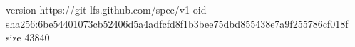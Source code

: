 version https://git-lfs.github.com/spec/v1
oid sha256:6be54401073cb52406d5a4adfcfd8f1b3bee75dbd855438e7a9f255786cf018f
size 43840
